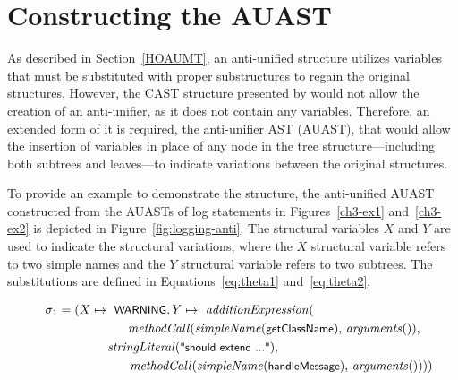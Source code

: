 
\section{Constructing the AUAST}  \label{auast}
%
As described in Section~\ref{HOAUMT}, an anti-unified structure utilizes variables that must be substituted with proper substructures to regain the original structures. However, the CAST structure presented by \citet{2008:fse:cottrell} would not allow the creation of an anti-unifier, as it does not contain any variables. Therefore, an extended form of it is required, the anti-unifier AST (AUAST), that would allow the insertion of variables in place of any node in the tree structure---including both subtrees and leaves---to indicate variations between the original structures.

To provide an example to demonstrate the structure, the anti-unified AUAST constructed from the AUASTs of log statements in Figures~\ref{ch3-ex1} and~\ref{ch3-ex2} is depicted in Figure~\ref{fig:logging-anti}. The structural variables $X$ and $Y$ are used to indicate the structural variations, where the $X$ structural variable refers to two simple names and the $Y$ structural variable refers to two subtrees. The substitutions are defined in Equations~\ref{eq:theta1} and~\ref{eq:theta2}.


\begin{align}
\sigma_1 = (X \mapsto \text{ \textsf{\small WARNING}}, Y \mapsto \text{ \textit{additionExpression}(}\hspace*{3cm}\nonumber\\
\text{\textit{methodCall}(\textit{simpleName}(\textsf{\small getClassName}), \textit{arguments}()),}\nonumber\\
\text{\textit{stringLiteral}(\textsf{\small "should extend ..."}),}\hspace*{4cm}\nonumber\\
\text{\textit{methodCall}(\textit{simpleName}(\textsf{\small handleMessage}), \textit{arguments}()))})\hspace*{-1em}\label{eq:theta1}
\end{align}

